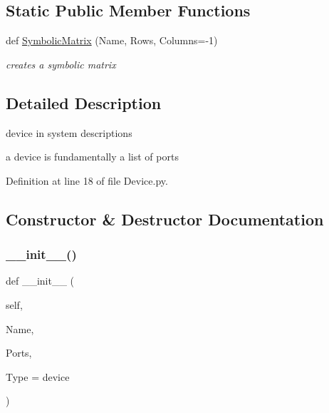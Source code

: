 \subsection*{Static Public Member Functions}
\begin{DoxyCompactItemize}
\item 
def \hyperlink{classSignalIntegrity_1_1SystemDescriptions_1_1Device_1_1Device_a2c70eb13042897e97cc142e6a0f69300}{Symbolic\+Matrix} (Name, Rows, Columns=-\/1)
\begin{DoxyCompactList}\small\item\em creates a symbolic matrix \end{DoxyCompactList}\end{DoxyCompactItemize}


\subsection{Detailed Description}
device in system descriptions 

a device is fundamentally a list of ports 

Definition at line 18 of file Device.\+py.



\subsection{Constructor \& Destructor Documentation}
\mbox{\label{classSignalIntegrity_1_1SystemDescriptions_1_1Device_1_1Device_aa13732b8be1d26511f983436259d282f}} 
\subsubsection{\texorpdfstring{\+\_\+\+\_\+init\+\_\+\+\_\+()}{\_\_init\_\_()}}
{\footnotesize\ttfamily def \+\_\+\+\_\+init\+\_\+\+\_\+ (\begin{DoxyParamCaption}\item[{}]{self,  }\item[{}]{Name,  }\item[{}]{Ports,  }\item[{}]{Type = {\ttfamily \textquotesingle{}device\textquotesingle{}} }\end{DoxyParamCaption})}



